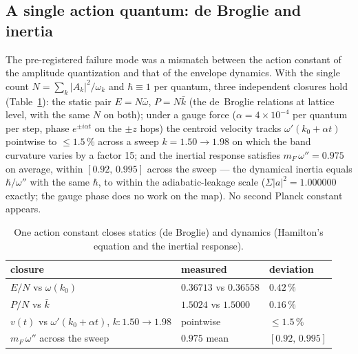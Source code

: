 \documentclass[11pt,a4paper]{article}
\theoremstyle{plain}
\theoremstyle{remark}
\begin{document}
\subsection{A single action quantum: de Broglie and inertia}
\label{app:schr_hbar}
The pre-registered failure mode was a mismatch between the action constant of the amplitude quantization and that of the envelope dynamics. With the single count $N = \sum_k |A_k|^2/\omega_k$ and $\hbar \equiv 1$ per quantum, three independent closures hold (Table~\ref{tab:schr_hbar}): the static pair $E = N\bar\omega$, $P = N\bar k$ (the de~Broglie relations at lattice level, with the same $N$ on both); under a gauge force ($\alpha = 4\times10^{-4}$ per quantum per step, phase $e^{\pm i\alpha t}$ on the $\pm z$ hops) the centroid velocity tracks $\omega'(k_0 + \alpha t)$ pointwise to $\le 1.5\,\%$ across a sweep $k = 1.50 \to 1.98$ on which the band curvature varies by a factor 15; and the inertial response satisfies $m_F\,\omega'' = 0.975$ on average, within $[0.92,\,0.995]$ across the sweep --- the dynamical inertia equals $\hbar/\omega''$ with the same $\hbar$, to within the adiabatic-leakage scale ($\Sigma|a|^2 = 1.000000$ exactly; the gauge phase does no work on the map). No second Planck constant appears.

\begin{table}[ht]\centering
\begin{tabular}{lll}
\toprule
closure & measured & deviation \\
\midrule
$E/N$ vs $\omega(k_0)$ & $0.36713$ vs $0.36558$ & $0.42\,\%$ \\
$P/N$ vs $\bar k$ & $1.5024$ vs $1.5000$ & $0.16\,\%$ \\
$v(t)$ vs $\omega'(k_0{+}\alpha t)$, $k: 1.50 \to 1.98$ & pointwise & $\le 1.5\,\%$ \\
$m_F\,\omega''$ across the sweep & $0.975$ mean & $[0.92,\,0.995]$ \\
\bottomrule
\end{tabular}
\caption{One action constant closes statics (de Broglie) and dynamics (Hamilton's equation and the inertial response).}
\label{tab:schr_hbar}
\end{table}
\end{document}
